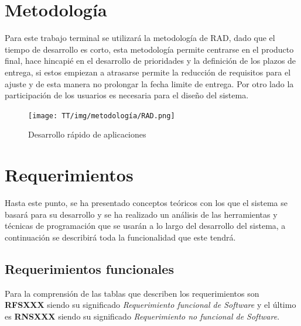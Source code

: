 \section{Metodología}
Para este trabajo terminal se utilizará la metodología de \acrfull{RAD}, dado que el tiempo de desarrollo es corto, esta metodología permite centrarse en el producto final, hace hincapié en el desarrollo de prioridades y la definición de los plazos de entrega, si estos empiezan a atrasarse permite la reducción de requisitos para el ajuste y de esta manera no prolongar la fecha limite de entrega. Por otro lado la participación de los usuarios es necesaria para el diseño del sistema.\cite{dra}

\begin{figure}[!ht]
    \centering
    \texttt{[image: TT/img/metodología/RAD.png]}
    \caption{Desarrollo rápido de aplicaciones}
    \label{graphic:RAD}
\end{figure}

\section{Requerimientos}
Hasta este punto, se ha presentado conceptos teóricos con los que el sistema se basará para su desarrollo y se ha realizado un análisis de las herramientas y técnicas de programación que se usarán a lo largo del desarrollo del sistema, a continuación se describirá toda la funcionalidad que este tendrá.

\subsection{Requerimientos funcionales}
Para la comprensión de las tablas que describen los requerimientos son \textbf{RFSXXX} siendo su significado \textit{Requerimiento funcional de Software} y el último es \textbf{RNSXXX} siendo su significado \textit{Requerimiento no funcional de Software}.

